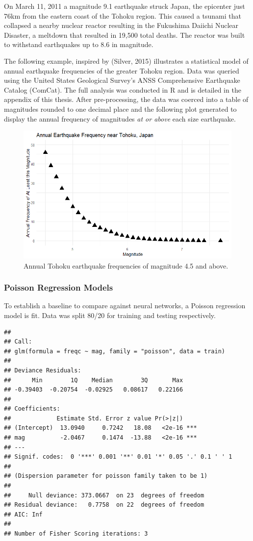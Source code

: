 
On March 11, 2011 a magnitude 9.1 earthquake struck Japan, the epicenter just 76km from the eastern coast of the Tohoku region.  This caused a tsunami that collapsed a nearby nuclear reactor resulting in the Fukushima Daiichi Nuclear Disaster, a meltdown that resulted in 19,500 total deaths.  The reactor was built to withstand earthquakes up to 8.6 in magnitude.

The following example, inspired by (Silver, 2015)\cite{silver2015signal} illustrates a statistical model of annual earthquake frequencies of the greater Tohoku region.
Data was queried using the United States Geological Survey's ANSS Comprehensive Earthquake Catalog (ComCat).  The full analysis was conducted in R and is detailed in the appendix of this thesis.
After pre-processing, the data was coerced into a table of magnitudes rounded to one decimal place and the following plot generated to display the annual frequency of magnitudes \textit{at or above} each size earthquake.

\begin{figure}[H]
    \center
    \includegraphics[width=0.75\linewidth]{Figures/tohoku_standardscale.png}
    \caption{\footnotesize{Annual Tohoku earthquake frequencies of magnitude 4.5 and above.}}
    \label{tohoku_unfit}
\end{figure}

\subsubsection{Poisson Regression Models}
To establish a baseline to compare against neural networks, a Poisson regression model is fit. Data was split 80/20 for training and testing respectively.  

\begin{verbatim}
## 
## Call:
## glm(formula = freqc ~ mag, family = "poisson", data = train)
## 
## Deviance Residuals: 
##      Min        1Q    Median        3Q       Max  
## -0.39403  -0.20754  -0.02925   0.08617   0.22166  
## 
## Coefficients:
##             Estimate Std. Error z value Pr(>|z|)    
## (Intercept)  13.0940     0.7242   18.08   <2e-16 ***
## mag          -2.0467     0.1474  -13.88   <2e-16 ***
## ---
## Signif. codes:  0 '***' 0.001 '**' 0.01 '*' 0.05 '.' 0.1 ' ' 1
## 
## (Dispersion parameter for poisson family taken to be 1)
## 
##     Null deviance: 373.0667  on 23  degrees of freedom
## Residual deviance:   0.7758  on 22  degrees of freedom
## AIC: Inf
## 
## Number of Fisher Scoring iterations: 3
\end{verbatim}

